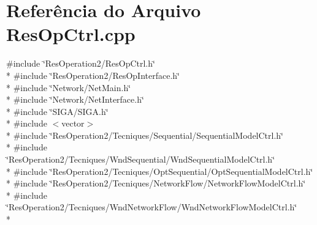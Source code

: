\section{Referência do Arquivo Res\+Op\+Ctrl.\+cpp}
\label{_res_op_ctrl_8cpp}
{\ttfamily \#include \char`\"{}Res\+Operation2/\+Res\+Op\+Ctrl.\+h\char`\"{}}\\*
{\ttfamily \#include \char`\"{}Res\+Operation2/\+Res\+Op\+Interface.\+h\char`\"{}}\\*
{\ttfamily \#include \char`\"{}Network/\+Net\+Main.\+h\char`\"{}}\\*
{\ttfamily \#include \char`\"{}Network/\+Net\+Interface.\+h\char`\"{}}\\*
{\ttfamily \#include \char`\"{}S\+I\+G\+A/\+S\+I\+G\+A.\+h\char`\"{}}\\*
{\ttfamily \#include $<$vector$>$}\\*
{\ttfamily \#include \char`\"{}Res\+Operation2/\+Tecniques/\+Sequential/\+Sequential\+Model\+Ctrl.\+h\char`\"{}}\\*
{\ttfamily \#include \char`\"{}Res\+Operation2/\+Tecniques/\+Wnd\+Sequential/\+Wnd\+Sequential\+Model\+Ctrl.\+h\char`\"{}}\\*
{\ttfamily \#include \char`\"{}Res\+Operation2/\+Tecniques/\+Opt\+Sequential/\+Opt\+Sequential\+Model\+Ctrl.\+h\char`\"{}}\\*
{\ttfamily \#include \char`\"{}Res\+Operation2/\+Tecniques/\+Network\+Flow/\+Network\+Flow\+Model\+Ctrl.\+h\char`\"{}}\\*
{\ttfamily \#include \char`\"{}Res\+Operation2/\+Tecniques/\+Wnd\+Network\+Flow/\+Wnd\+Network\+Flow\+Model\+Ctrl.\+h\char`\"{}}\\*
